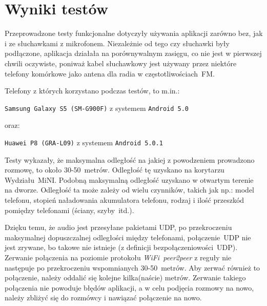 \documentclass[a4paper,titlepage]{article}
\theoremstyle{break}
\begin{document}

\section{Wyniki testów}

Przeprowadzone testy funkcjonalne dotyczyły używania aplikacji zarówno bez, jak i ze słuchawkami z mikrofonem. Niezależnie od tego czy słuchawki były podłączone, aplikacja działała na porównywalnym zasięgu, co nie jest w pierwszej chwili oczywiste, poniważ kabel słuchawkowy jest używany przez niektóre telefony komórkowe jako antena dla radia w częstotliwościach~FM.

Telefony z których korzystano podczas testów, to m.in.:
\begin{center}
	\texttt{Samsung~Galaxy~S5~(SM-G900F)} z systemem \texttt{Android~5.0}
\end{center}
oraz:
\begin{center}
	\texttt{Huawei~P8~(GRA-L09)} z systemem \texttt{Android~5.0.1}
\end{center}
Testy wykazały, że maksymalna odległość na jakiej z powodzeniem prowadzono rozmowę, to około 30-50~metrów. Odległość tę uzyskano na korytarzu Wydziału~MiNI. Podobną maksymalną odległość uzyskano w otwartym terenie na dworze. Odległość ta może zależy od wielu czynników, takich jak np.: model telefonu, stopień naładowania akumulatora telefonu, rodzaj i ilość przeszkód pomiędzy telefonami (ściany, szyby~itd.).

Dzięku temu, że audio jest przesyłane pakietami UDP, po przekroczeniu maksymalnej dopuszczalnej odległości między telefonami, połączenie~UDP nie jest zrywane, bo takowe nie istnieje (z definicji bezpołączeniowości~UDP). Zerwanie połączenia na poziomie protokołu \emph{WiFi~peer2peer} z reguły nie następuje po przekroczeniu wspomnianych 30-50~metrów. Aby zerwać również to połączenie, należy oddalić się kolejne kilka(naście) metrów. Zerwanie takiego połączenia nie powoduje błędów aplikacji, a w celu podjęcia rozmowy na nowo, należy zbliżyć się do rozmówcy i nawiązać połączenie na nowo.


\newpage
\end{document}
